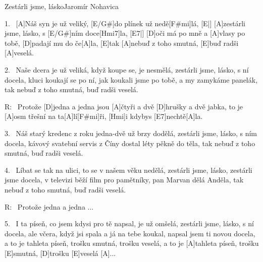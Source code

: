 \begin{song}{Zestárli jsme, lásko}{Jaromír Nohavica}

\begin{xverse}{1.~}
[\large A]Náš syn je už veliký, [\large E/G#]do plínek už nedě[\large F#mi]lá, [\large E|]{}
[\large A]zestárli jsme, lásko, s [\large E/G#]ním doce[\large Hmi7]la,  [\large E7|]{}
[\large D]oči má po mně a [\large A]vlasy po tobě,
[\large D]padají mu do če[\large A]la,
[\large E]tak [\large A]nebuď z toho smutná, [\large E]buď radši [\large A]veselá.
\end{xverse}

\begin{xverse}{2.~}
Naše dcera je už veliká, když koupe se, je nesmělá,
zestárli jsme, lásko, s ní docela,
kluci koukají se po ní, jak koukali jsme po tobě,
a my zamykáme panelák,
tak nebuď z toho smutná, buď radši veselá.
\end{xverse}

\begin{xverse}{R:~}
Protože [\large D]jedna a jedna jsou [\large A]{čt}yři
a dvě [\large D]hrušky a dvě jabka, to je [\large A]osm třešní na ta[\large A]lí[\large F#mi]{ři},
[\large Hmi]i kdybys [\large E7]nechtě[\large A]la.
\end{xverse}

\begin{xverse}{3.~}
Náš starý kredenc z roku jedna-dvě už brzy dodělá,
zestárli jsme, lásko, s ním docela,
kávový svatební servis z Číny
dostal léty pěkně do těla,
tak nebuď z toho smutná, buď radši veselá.
\end{xverse}

\begin{xverse}{4.~}
Líbat se tak na ulici, to se v našem věku nedělá,
zestárli jsme, lásko, zestárli jsme docela,
v televizi běží film pro pamětníky,
pan Marvan dělá Anděla,
tak nebuď z toho smutná, buď radši veselá.
\end{xverse}

\begin{xverse}{R:~}
Protože jedna a jedna ...
\end{xverse}

\begin{xverse}{5.~}
I ta píseň, co jsem kdysi pro tě napsal, je už omšelá,
zestárli jsme, lásko, s ní docela,
ale včera, když jsi spala a já na tebe koukal,
napsal jsem ti novou docela,
a to je tahleta píseň, trošku smutná, trošku veselá,
a to je [\large A]tahleta píseň, trošku [\large E]smutná, [\large D]trošku [\large E]veselá [\large A]...
\end{xverse}

\end{song}



